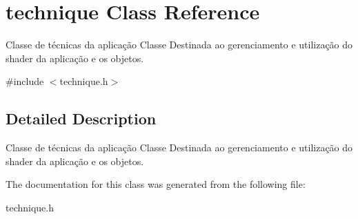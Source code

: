 \hypertarget{classtechnique}{\section{technique Class Reference}
\label{classtechnique}
}


Classe de técnicas da aplicação Classe Destinada ao gerenciamento e utilização do shader da aplicação e os objetos.  




{\ttfamily \#include $<$technique.\-h$>$}



\subsection{Detailed Description}
Classe de técnicas da aplicação Classe Destinada ao gerenciamento e utilização do shader da aplicação e os objetos. 

The documentation for this class was generated from the following file\-:\begin{DoxyCompactItemize}
\item 
technique.\-h\end{DoxyCompactItemize}
